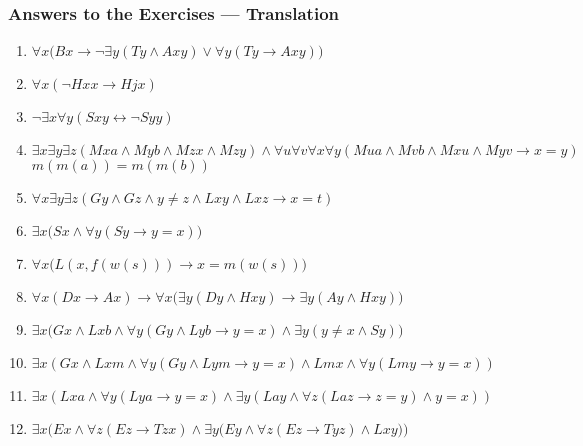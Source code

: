 \documentclass[UTF8,11pt,colorlinks,compress,openany]{beamer}%
\begin{document}
\begin{frame}\frametitle{Answers to the Exercises --- Translation}
\begin{enumerate}
	\item $\forall x\big(Bx\to \neg\exists y(Ty\wedge Axy)\vee \forall y(Ty\to Axy)\big)$
	\item $\forall x(\neg Hxx\to Hjx)$
	\item $\neg\exists x\forall y(Sxy\leftrightarrow\neg Syy)$
	\item $\exists x\exists y\exists z(Mxa\wedge Myb\wedge Mzx\wedge Mzy)\wedge\forall u\forall v\forall x\forall y(Mua\wedge Mvb\wedge Mxu\wedge Myv\to x=y)$\hfill $m(m(a))=m(m(b))$
	\item $\forall x\exists y\exists z(Gy\wedge Gz\wedge y\ne z\wedge Lxy\wedge Lxz\to x=t)$
	\item $\exists x\big(Sx\wedge\forall y(Sy\to y=x)\big)$
	\item $\forall x\big(L(x,f(w(s)))\to x=m(w(s))\big)$
	\item $\forall x(Dx\to Ax)\to\forall x\big(\exists y(Dy\wedge Hxy)\to\exists y(Ay\wedge Hxy)\big)$
	\item $\exists x\big(Gx\wedge Lxb\wedge\forall y(Gy\wedge Lyb\to y=x)\wedge\exists y(y\ne x\wedge Sy)\big)$
	\item $\exists x(Gx\wedge Lxm\wedge\forall y(Gy\wedge Lym\to y=x)\wedge Lmx\wedge \forall y(Lmy\to y=x))$
	\item $\exists x(Lxa\wedge\forall y(Lya\to y=x)\wedge\exists y(Lay\wedge\forall z(Laz\to z=y)\wedge y=x))$
	\item $\exists x\Big(Ex\wedge \forall z(Ez\to Tzx)\wedge \exists y\big(Ey\wedge\forall z(Ez\to Tyz)\wedge Lxy\big)\Big)$
\end{enumerate}
\end{frame}
\end{document}
